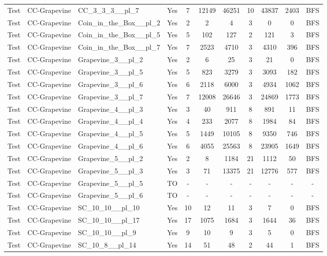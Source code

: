 \documentclass{article}
\begin{document}
\begin{tabular}{lllcccccccc}
Test & CC-Grapevine & CC\_3\_3\_3\_\_pl\_7 & Yes & 7 & 12149 & 46251 & 10 & 43837 & 2403 & BFS \\
Test & CC-Grapevine & Coin\_in\_the\_Box\_\_pl\_2 & Yes & 2 & 2 & 4 & 3 & 0 & 0 & BFS \\
Test & CC-Grapevine & Coin\_in\_the\_Box\_\_pl\_5 & Yes & 5 & 102 & 127 & 2 & 121 & 3 & BFS \\
Test & CC-Grapevine & Coin\_in\_the\_Box\_\_pl\_7 & Yes & 7 & 2523 & 4710 & 3 & 4310 & 396 & BFS \\
Test & CC-Grapevine & Grapevine\_3\_\_pl\_2 & Yes & 2 & 6 & 25 & 3 & 21 & 0 & BFS \\
Test & CC-Grapevine & Grapevine\_3\_\_pl\_5 & Yes & 5 & 823 & 3279 & 3 & 3093 & 182 & BFS \\
Test & CC-Grapevine & Grapevine\_3\_\_pl\_6 & Yes & 6 & 2118 & 6000 & 3 & 4934 & 1062 & BFS \\
Test & CC-Grapevine & Grapevine\_3\_\_pl\_7 & Yes & 7 & 12008 & 26646 & 3 & 24869 & 1773 & BFS \\
Test & CC-Grapevine & Grapevine\_4\_\_pl\_3 & Yes & 3 & 40 & 911 & 8 & 891 & 11 & BFS \\
Test & CC-Grapevine & Grapevine\_4\_\_pl\_4 & Yes & 4 & 233 & 2077 & 8 & 1984 & 84 & BFS \\
Test & CC-Grapevine & Grapevine\_4\_\_pl\_5 & Yes & 5 & 1449 & 10105 & 8 & 9350 & 746 & BFS \\
Test & CC-Grapevine & Grapevine\_4\_\_pl\_6 & Yes & 6 & 4055 & 25563 & 8 & 23905 & 1649 & BFS \\
Test & CC-Grapevine & Grapevine\_5\_\_pl\_2 & Yes & 2 & 8 & 1184 & 21 & 1112 & 50 & BFS \\
Test & CC-Grapevine & Grapevine\_5\_\_pl\_3 & Yes & 3 & 71 & 13375 & 21 & 12776 & 577 & BFS \\
Test & CC-Grapevine & Grapevine\_5\_\_pl\_5 & TO & - & - & - & - & - & - & - \\
Test & CC-Grapevine & Grapevine\_5\_\_pl\_6 & TO & - & - & - & - & - & - & - \\
Test & CC-Grapevine & SC\_10\_10\_\_pl\_10 & Yes & 10 & 12 & 11 & 3 & 7 & 0 & BFS \\
Test & CC-Grapevine & SC\_10\_10\_\_pl\_17 & Yes & 17 & 1075 & 1684 & 3 & 1644 & 36 & BFS \\
Test & CC-Grapevine & SC\_10\_10\_\_pl\_9 & Yes & 9 & 10 & 9 & 3 & 5 & 0 & BFS \\
Test & CC-Grapevine & SC\_10\_8\_\_pl\_14 & Yes & 14 & 51 & 48 & 2 & 44 & 1 & BFS \\

\end{tabular}
\end{document}
